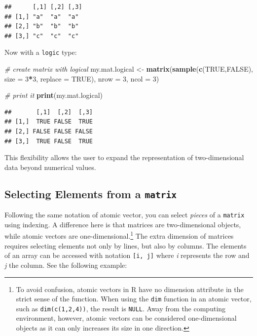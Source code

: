 \documentclass[11pt,]{book}
\newenvironment{Shaded}{\begin{snugshade}}{\end{snugshade}}
\newcommand{\KeywordTok}[1]{\textcolor[rgb]{0.27,0.27,0.27}{\textbf{#1}}}
\newcommand{\DataTypeTok}[1]{\textcolor[rgb]{0.27,0.27,0.27}{#1}}
\newcommand{\DecValTok}[1]{\textcolor[rgb]{0.06,0.06,0.06}{#1}}
\newcommand{\StringTok}[1]{\textcolor[rgb]{0.5,0.5,0.5}{#1}}
\newcommand{\CommentTok}[1]{\textcolor[rgb]{0.56,0.35,0.01}{\textit{#1}}}
\newcommand{\OtherTok}[1]{\textcolor[rgb]{0.56,0.35,0.01}{#1}}
\newcommand{\OperatorTok}[1]{\textcolor[rgb]{0.81,0.36,0.00}{\textbf{#1}}}
\newcommand{\NormalTok}[1]{#1}
\let\rmarkdownfootnote\footnote%
\def\footnote{\protect\rmarkdownfootnote}
\begin{document}
\begin{verbatim}
##      [,1] [,2] [,3]
## [1,] "a"  "a"  "a" 
## [2,] "b"  "b"  "b" 
## [3,] "c"  "c"  "c"
\end{verbatim}

Now with a \texttt{logic} type:

\begin{Shaded}
\begin{Highlighting}[]
\CommentTok{# create matrix with logical}
\NormalTok{my.mat.logical <-}\StringTok{ }\KeywordTok{matrix}\NormalTok{(}\KeywordTok{sample}\NormalTok{(}\KeywordTok{c}\NormalTok{(}\OtherTok{TRUE}\NormalTok{,}\OtherTok{FALSE}\NormalTok{), }
                                \DataTypeTok{size =} \DecValTok{3}\OperatorTok{*}\DecValTok{3}\NormalTok{,}
                                \DataTypeTok{replace =} \OtherTok{TRUE}\NormalTok{),}
                         \DataTypeTok{nrow =} \DecValTok{3}\NormalTok{, }
                         \DataTypeTok{ncol =} \DecValTok{3}\NormalTok{)}

\CommentTok{# print it                    }
\KeywordTok{print}\NormalTok{(my.mat.logical)}
\end{Highlighting}
\end{Shaded}

\begin{verbatim}
##       [,1]  [,2]  [,3]
## [1,]  TRUE FALSE  TRUE
## [2,] FALSE FALSE FALSE
## [3,]  TRUE FALSE  TRUE
\end{verbatim}

This flexibility allows the user to expand the representation of
two-dimensional data beyond numerical values.

\subsection{\texorpdfstring{Selecting Elements from a
\texttt{matrix}}{Selecting Elements from a matrix}}\label{selecting-elements-from-a-matrix}

Following the same notation of atomic vector, you can select
\emph{pieces} of a \texttt{matrix} using indexing. A difference here is
that matrices are two-dimensional objects, while atomic vectors are
one-dimensional.\footnote{To avoid confusion, atomic vectors in R have
  no dimension attribute in the strict sense of the function. When using
  the \texttt{dim} function in an atomic vector, such as
  \texttt{dim(c(1,2,4))}, the result is \texttt{NULL}. Away from the
  computing environment, however, atomic vectors can be considered
  one-dimensional objects as it can only increases its size in one
  direction.} The extra dimension of matrices requires selecting
elements not only by lines, but also by columns. The elements of an
array can be accessed with notation \texttt{{[}i,\ j{]}} where \emph{i}
represents the row and \emph{j} the column. See the following example:
\end{document}
